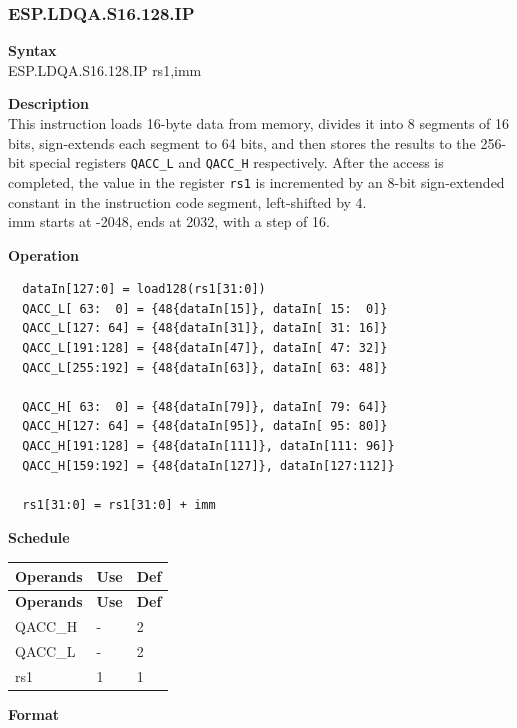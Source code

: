 \newpage
\subsubsection{ESP.LDQA.S16.128.IP}\label{instruction:ESPLDQAS16128IP}
\textbf{Syntax}\\
ESP.LDQA.S16.128.IP rs1,imm

\textbf{Description}\\
This instruction loads 16-byte data from memory, divides it into 8 segments of 16 bits, sign-extends each segment to 64 bits, and then stores the results to the 256-bit special registers \lstinline{QACC_L} and \lstinline{QACC_H} respectively. After the access is completed, the value in the register \lstinline{rs1} is incremented by an 8-bit sign-extended constant in the instruction code segment, left-shifted by 4.\\

imm starts at -2048, ends at 2032, with a step of 16.

\textbf{Operation}
\begin{lstlisting}
  dataIn[127:0] = load128(rs1[31:0])
  QACC_L[ 63:  0] = {48{dataIn[15]}, dataIn[ 15:  0]}
  QACC_L[127: 64] = {48{dataIn[31]}, dataIn[ 31: 16]}
  QACC_L[191:128] = {48{dataIn[47]}, dataIn[ 47: 32]}
  QACC_L[255:192] = {48{dataIn[63]}, dataIn[ 63: 48]}

  QACC_H[ 63:  0] = {48{dataIn[79]}, dataIn[ 79: 64]}
  QACC_H[127: 64] = {48{dataIn[95]}, dataIn[ 95: 80]}
  QACC_H[191:128] = {48{dataIn[111]}, dataIn[111: 96]}
  QACC_H[159:192] = {48{dataIn[127]}, dataIn[127:112]}

  rs1[31:0] = rs1[31:0] + imm
\end{lstlisting}

\textbf{Schedule}\\
\begin{longtable}[c]{|l|l|l|}
    \hline
    \rowcolor{lightgray}
    \textbf{Operands} & \textbf{Use} & \textbf{Def} \\\hline
    \endfirsthead
    \hline
    \rowcolor{lightgray}
     \textbf{Operands} & \textbf{Use} & \textbf{Def} \\\hline
    \endhead
    \hline
    \endfoot

  QACC\_H & - & 2 \\\hline
    QACC\_L & - & 2 \\\hline
  rs1 & 1 & 1

\end{longtable}

\textbf{Format}\\

